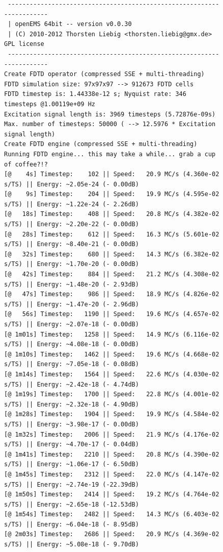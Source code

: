 \documentclass[twocolumn]{article}
\begin{document}
\begin{figure}[p,h!]
\centering
\small
\begin{verbatim}
 ----------------------------------------------------------------------
 | openEMS 64bit -- version v0.0.30
 | (C) 2010-2012 Thorsten Liebig <thorsten.liebig@gmx.de>  GPL license
 ----------------------------------------------------------------------
Create FDTD operator (compressed SSE + multi-threading)
FDTD simulation size: 97x97x97 --> 912673 FDTD cells
FDTD timestep is: 1.44338e-12 s; Nyquist rate: 346 timesteps @1.00119e+09 Hz
Excitation signal length is: 3969 timesteps (5.72876e-09s)
Max. number of timesteps: 50000 ( --> 12.5976 * Excitation signal length)
Create FDTD engine (compressed SSE + multi-threading)
Running FDTD engine... this may take a while... grab a cup of coffee?!?
[@    4s] Timestep:    102 || Speed:   20.9 MC/s (4.360e-02 s/TS) || Energy: ~2.05e-24 (- 0.00dB)
[@    9s] Timestep:    204 || Speed:   19.9 MC/s (4.595e-02 s/TS) || Energy: ~1.22e-24 (- 2.26dB)
[@   18s] Timestep:    408 || Speed:   20.8 MC/s (4.382e-02 s/TS) || Energy: ~2.20e-22 (- 0.00dB)
[@   28s] Timestep:    612 || Speed:   16.3 MC/s (5.601e-02 s/TS) || Energy: ~8.40e-21 (- 0.00dB)
[@   32s] Timestep:    680 || Speed:   14.3 MC/s (6.382e-02 s/TS) || Energy: ~1.70e-20 (- 0.00dB)
[@   42s] Timestep:    884 || Speed:   21.2 MC/s (4.308e-02 s/TS) || Energy: ~1.48e-20 (- 2.93dB)
[@   47s] Timestep:    986 || Speed:   18.9 MC/s (4.826e-02 s/TS) || Energy: ~1.47e-20 (- 2.96dB)
[@   56s] Timestep:   1190 || Speed:   19.6 MC/s (4.657e-02 s/TS) || Energy: ~2.07e-18 (- 0.00dB)
[@ 1m01s] Timestep:   1258 || Speed:   14.9 MC/s (6.116e-02 s/TS) || Energy: ~4.08e-18 (- 0.00dB)
[@ 1m10s] Timestep:   1462 || Speed:   19.6 MC/s (4.668e-02 s/TS) || Energy: ~7.05e-18 (- 0.08dB)
[@ 1m14s] Timestep:   1564 || Speed:   22.6 MC/s (4.030e-02 s/TS) || Energy: ~2.42e-18 (- 4.74dB)
[@ 1m19s] Timestep:   1700 || Speed:   22.8 MC/s (4.001e-02 s/TS) || Energy: ~2.32e-18 (- 4.90dB)
[@ 1m28s] Timestep:   1904 || Speed:   19.9 MC/s (4.584e-02 s/TS) || Energy: ~3.98e-17 (- 0.00dB)
[@ 1m32s] Timestep:   2006 || Speed:   21.9 MC/s (4.176e-02 s/TS) || Energy: ~4.70e-17 (- 0.04dB)
[@ 1m41s] Timestep:   2210 || Speed:   20.8 MC/s (4.390e-02 s/TS) || Energy: ~1.06e-17 (- 6.50dB)
[@ 1m45s] Timestep:   2312 || Speed:   22.0 MC/s (4.147e-02 s/TS) || Energy: ~2.74e-19 (-22.39dB)
[@ 1m50s] Timestep:   2414 || Speed:   19.2 MC/s (4.764e-02 s/TS) || Energy: ~2.65e-18 (-12.53dB)
[@ 1m54s] Timestep:   2482 || Speed:   14.3 MC/s (6.403e-02 s/TS) || Energy: ~6.04e-18 (- 8.95dB)
[@ 2m03s] Timestep:   2686 || Speed:   20.9 MC/s (4.369e-02 s/TS) || Energy: ~5.08e-18 (- 9.70dB)

\end{verbatim}
\end{figure}
\end{document}
